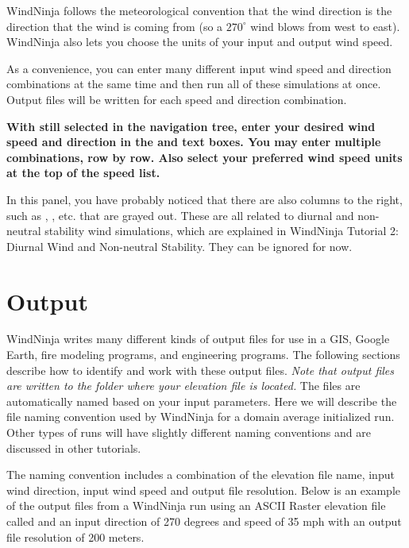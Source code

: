 \documentclass[12pt]{article}
\begin{document}
WindNinja follows the meteorological convention that the wind direction is the direction that the wind is coming from (so a $270^{\circ}$  wind blows from west to east).  WindNinja also lets you choose the units of your input and output wind speed.

As a convenience, you can enter many different input wind speed and direction combinations at the same time and then run all of these simulations at once.  Output files will be written for each speed and direction combination.

\textbf{\color{red} With  still selected in the navigation tree, enter your desired wind speed and direction in the  and  text boxes.  You may enter multiple combinations, row by row.  Also select your preferred wind speed units at the top of the speed list.}

In this panel, you have probably noticed that there are also columns to the right, such as , , etc. that are grayed out.  These are all related to diurnal and non-neutral stability wind simulations, which are explained in WindNinja Tutorial 2: Diurnal Wind and Non-neutral Stability.  They can be ignored for now.

\section{Output}

WindNinja writes many different kinds of output files for use in a GIS, Google Earth, fire modeling programs, and engineering programs.  The following sections describe how to identify and work with these output files.  \textit{Note that output files are written to the folder where your elevation file is located.} The files are automatically named based on your input parameters.  Here we will describe the file naming convention used by WindNinja for a domain average initialized run.  Other types of runs will have slightly different naming conventions and are discussed in other tutorials.

The naming convention includes a combination of the elevation file name, input wind direction, input wind speed and output file resolution.  Below is an example of the output files from a WindNinja run using an ASCII Raster elevation file called  and an input direction of 270 degrees and speed of 35 mph with an output file resolution of 200 meters.
\end{document}
